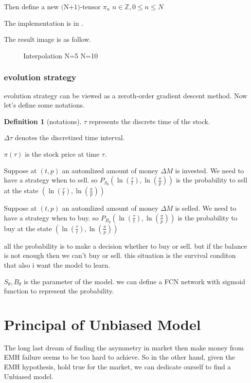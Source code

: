 \documentclass{article}
\theoremstyle{definition} %
\newtheorem{definition}{Definition}[section]
\begin{document}
Then define a new $\text{(N+1)-tensor}$
$\pi_n$
$n\in\mathbb{Z},0\leq n\leq N$

The implementation is in
\cite[computeGraph]{Data_process}.

The result image is as follow.
\begin{figure}[!ht]
    \centering
    \caption{Interpolation N=5 N=10}
\end{figure}

\subsubsection{evolution strategy}
evolution strategy can be viewed as a
zeroth-order gradient descent method.
Now let's define some notations.
\begin{definition}[notations]
    \label{def:notations}
    $\tau$ represents the discrete time of the stock.

    $\Delta\tau$ denotes the discretized time interval.

    $\pi(\tau)$ is the stock price at time $\tau$.

    Suppose at $(t,p)$
    an automlized amount
    of money $\Delta M$ is invested.
    We need to have a strategy when to sell.
    so $P_{S_\theta}(\ln(\frac{\tau}{t}),\ln(\frac{\pi}{p}))$
    is the probability to sell at the state
    $(\ln(\frac{\tau}{t}),\ln(\frac{\pi}{p}))$

    Suppose at $(t,p)$
    an automlized amount
    of money $\Delta M$ is selled.
    We need to have a strategy when to buy.
    so $P_{B_\theta}(\ln(\frac{\tau}{t}),\ln(\frac{\pi}{p}))$
    is the probability to buy at the state
    $(\ln(\frac{\tau}{t}),\ln(\frac{\pi}{p}))$

    all the probability is to make a decision
    whether to buy or sell. but if the balance is
    not enough then we can't buy or sell.
    this situation is the survival conditon that
    also i want the model to learn.

    $S_\theta,B_\theta$ is the
    parameter of the model.
    we can define a FCN network with sigmoid
    function to represent the probability.


\end{definition}

\section{Principal of Unbiased Model}
The long last dream of finding the asymmetry
in market then make money from EMH failure
seems to be too hard to achieve.
So in the other hand, given the EMH hypothesis,
hold true for the market, we can dedicate
ourself to find a Unbiased model.
\end{document}
